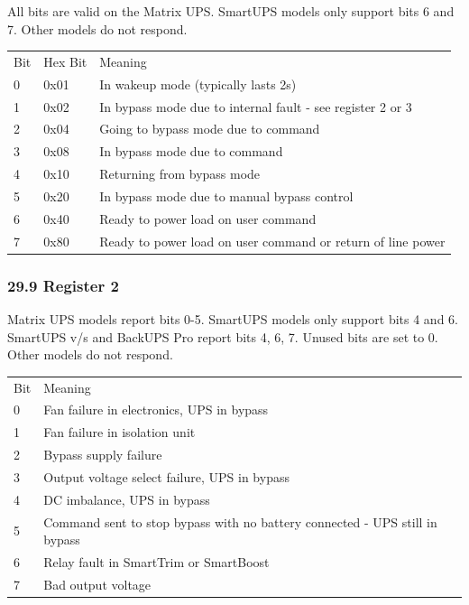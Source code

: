 All bits are valid on the Matrix UPS. SmartUPS models only support bits 6 and
7. Other models do not respond.  

\begin{longtable}{lll}
{Bit} & {Hex Bit} & {Meaning 
 } \\
{0} & {0x01} & {In wakeup mode (typically lasts \lt{} 2s) 
 } \\
{1} & {0x02} & {In bypass mode due to internal fault - see register 2 or 3 
 } \\
{2} & {0x04} & {Going to bypass mode due to command 
 } \\
{3} & {0x08} & {In bypass mode due to command 
 } \\
{4} & {0x10} & {Returning from bypass mode 
 } \\
{5} & {0x20} & {In bypass mode due to manual bypass control 
 } \\
{6} & {0x40} & {Ready to power load on user command 
 } \\
{7} & {0x80} & {Ready to power load on user command or return of line power  
}

\end{longtable}

\label{Register-2}

\subsubsection*{29.9 Register 2}

Matrix UPS models report bits 0-5. SmartUPS models only support bits 4 and 6.
SmartUPS v/s and BackUPS Pro report bits 4, 6, 7. Unused bits are set to 0.
Other models do not respond.  

\begin{longtable}{ll}
{Bit} & {Meaning 
 } \\
{0} & {Fan failure in electronics, UPS in bypass 
 } \\
{1} & {Fan failure in isolation unit 
 } \\
{2} & {Bypass supply failure 
 } \\
{3} & {Output voltage select failure, UPS in bypass 
 } \\
{4} & {DC imbalance, UPS in bypass 
 } \\
{5} & {Command sent to stop bypass with no battery connected - UPS still in
bypass 
 } \\
{6} & {Relay fault in SmartTrim or SmartBoost 
 } \\
{7} & {Bad output voltage  
}

\end{longtable}

